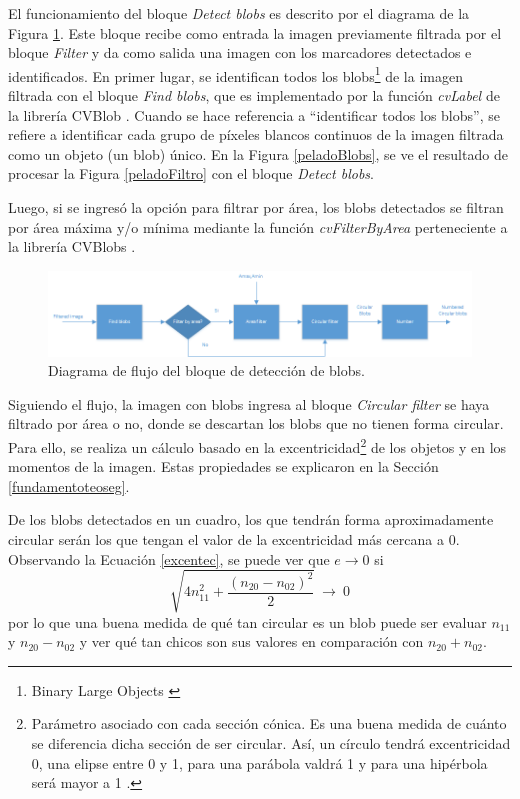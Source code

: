 El funcionamiento del bloque \emph{Detect blobs} es descrito por el diagrama de la Figura \ref{diagramadetectblobs}. Este bloque recibe como entrada la imagen previamente filtrada por el bloque \emph{Filter} y da como salida una imagen con los marcadores detectados e identificados. En primer lugar, se identifican todos los blobs\footnote{Binary Large Objects \cite{defBlob}} de la imagen filtrada con el bloque \emph{Find blobs}, que es implementado por la función \emph{cvLabel} de la librería CVBlob \cite{cvblob}. Cuando se hace referencia a ``identificar todos los blobs'', se refiere a identificar cada grupo de píxeles blancos continuos de la imagen filtrada como un objeto (un blob) único. En la Figura \ref{peladoBlobs}, se ve el resultado de procesar la Figura \ref{peladoFiltro} con el bloque \emph{Detect blobs}. 

Luego, si se ingresó la opción para filtrar por área, los blobs \cite{defBlob} detectados se filtran por área máxima y/o mínima mediante la función \emph{cvFilterByArea} perteneciente a la librería CVBlobs \cite{cvblob}. 

\begin{figure}[H]
\hspace{-1.5cm}
\includegraphics[scale=0.7]{img/detectBlobs_diagrama.png}
\caption{Diagrama de flujo del bloque de detección de blobs.}
\label{diagramadetectblobs}
\end{figure}

Siguiendo el flujo, la imagen con blobs ingresa al bloque \emph{Circular filter} se haya filtrado por área o no, donde se descartan los blobs que no tienen forma circular. Para ello, se realiza un cálculo basado en la excentricidad\footnote{Parámetro asociado con cada sección cónica. Es una buena medida de cuánto se diferencia dicha sección de ser circular. Así, un círculo tendrá excentricidad 0, una elipse entre 0 y 1, para una parábola valdrá 1 y para una hipérbola será mayor a 1 \cite{excentricidad}. } de los objetos y en los momentos de la imagen. Estas propiedades se explicaron en la Sección \ref{fundamentoteoseg}.

De los blobs detectados en un cuadro, los que tendrán forma aproximadamente circular serán los que tengan el valor de la excentricidad más cercana a $0$. Observando la Ecuación \ref{excentec}, se puede ver que $e{\rightarrow}0$ si $$\sqrt{4n_{11}^2+\frac{(n_{20}-n_{02})^2}{2}}\ {\rightarrow}\ 0$$ por lo que una buena medida de qué tan circular es un blob puede ser evaluar $n_{11}$ y $n_{20}-n_{02}$ y ver qué tan chicos son sus valores en comparación con $n_{20}+n_{02}$.

